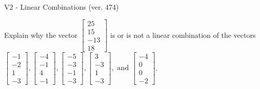 \begin{exercise}
  \begin{exerciseTitle}V2 - Linear Combinations (ver. 474)\end{exerciseTitle}
  \begin{exerciseStatement}
    Explain why the vector \(\left[\begin{array}{c}
25 \\
15 \\
-13 \\
18
\end{array}\right]\)  is or is not a linear 
	combination of the vectors \(\left[\begin{array}{c}
-1 \\
-2 \\
1 \\
-3
\end{array}\right] , \left[\begin{array}{c}
-4 \\
-1 \\
4 \\
-1
\end{array}\right] , \left[\begin{array}{c}
-5 \\
-3 \\
-1 \\
-3
\end{array}\right] , \left[\begin{array}{c}
3 \\
-3 \\
1 \\
-3
\end{array}\right] , \text{ and } \left[\begin{array}{c}
-4 \\
0 \\
0 \\
-2
\end{array}\right]\).
	



\end{exerciseStatement}
\end{exercise}
